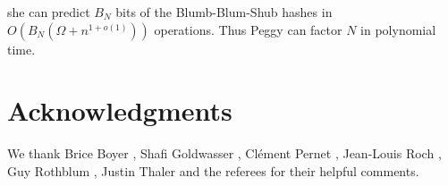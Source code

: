 \documentclass{article}
\newcommand{\balancecolumns}{}
\newcommand{\bigO}[1]{\ensuremath{O(#1)}\xspace}
\begin{document}
she can predict $B_N$ bits of the Blumb-Blum-Shub hashes in
$\bigO{B_N(\Omega+n^{1+o(1)})}$ operations. 
Thus Peggy can factor $N$ in polynomial time.

 
 
 
 
 

 
 
 
 
 
 
 

 
 
 
 

 
 
 
 
 
 

 
 

 
\section*{Acknowledgments} 
We thank Brice Boyer 
, Shafi Goldwasser 
, Cl\'ement Pernet 
, Jean-Louis Roch 
, Guy Rothblum 
, Justin Thaler  
and the referees  
for their helpful comments.   

 
 
  

\balancecolumns
\end{document}
